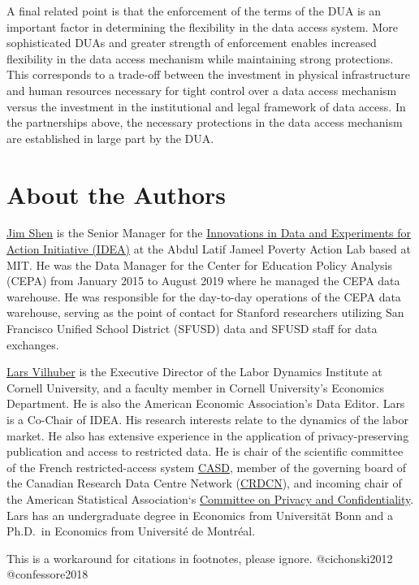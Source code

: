 A final related point is that the enforcement of the terms of the DUA is an important factor in determining the flexibility in the data access system. More sophisticated DUAs and greater strength of enforcement enables increased flexibility in the data access mechanism while maintaining strong protections. This corresponds to a trade-off between the investment in physical infrastructure and human resources necessary for tight control over a data access mechanism versus the investment in the institutional and legal framework of data access. In the partnerships above, the necessary protections in the data access mechanism are established in large part by the DUA.

\hypertarget{about-the-authors}{%
\section*{About the Authors}\label{about-the-authors}}

\href{https://www.povertyactionlab.org/person/shen}{Jim Shen} is the Senior Manager for the \href{https://www.povertyactionlab.org/initiative/innovations-data-experiments-action}{Innovations in Data and Experiments for Action Initiative (IDEA)} at the Abdul Latif Jameel Poverty Action Lab based at MIT. He was the Data Manager for the Center for Education Policy Analysis (CEPA) from January 2015 to August 2019 where he managed the CEPA data warehouse. He was responsible for the day-to-day operations of the CEPA data warehouse, serving as the point of contact for Stanford researchers utilizing San Francisco Unified School District (SFUSD) data and SFUSD staff for data exchanges.

\href{https://lars.vilhuber.com/}{Lars Vilhuber} is the Executive Director of the Labor Dynamics Institute at Cornell University, and a faculty member in Cornell University's Economics Department. He is also the American Economic Association's Data Editor. Lars is a Co-Chair of IDEA. His research interests relate to the dynamics of the labor market. He also has extensive experience in the application of privacy-preserving publication and access to restricted data. He is chair of the scientific committee of the French restricted-access system \href{https://casd.eu}{CASD}, member of the governing board of the Canadian Research Data Centre Network (\href{https://crdcn.org}{CRDCN}), and incoming chair of the American Statistical Association`s \href{https://community.amstat.org/cpc/home}{Committee on Privacy and Confidentiality}. Lars has an undergraduate degree in Economics from Universität Bonn and a Ph.D.~in Economics from Université de Montréal.

\begin{invisible}
This is a workaround for citations in footnotes, please ignore.
@cichonski2012 @confessore2018
\end{invisible}

\putbib


